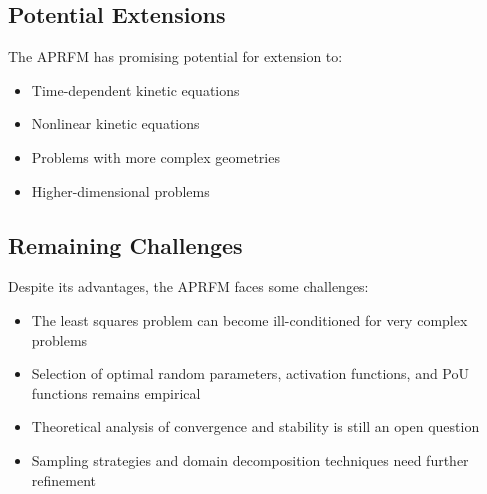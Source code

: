\documentclass[11pt]{article}
\begin{document}
\subsection{Potential Extensions}

The APRFM has promising potential for extension to:
\begin{itemize}
    \item Time-dependent kinetic equations
    \item Nonlinear kinetic equations
    \item Problems with more complex geometries
    \item Higher-dimensional problems
\end{itemize}

\subsection{Remaining Challenges}

Despite its advantages, the APRFM faces some challenges:
\begin{itemize}
    \item The least squares problem can become ill-conditioned for very complex problems
    \item Selection of optimal random parameters, activation functions, and PoU functions remains empirical
    \item Theoretical analysis of convergence and stability is still an open question
    \item Sampling strategies and domain decomposition techniques need further refinement
\end{itemize}
\end{document}
